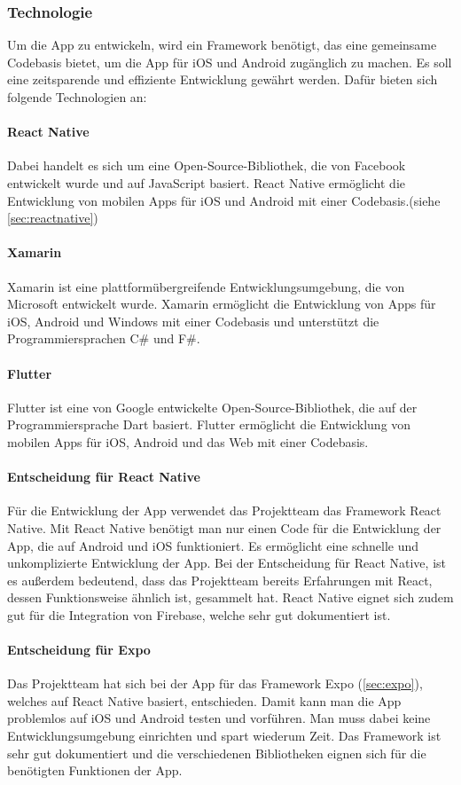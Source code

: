 \subsubsection{Technologie}
Um die App zu entwickeln, wird ein \Gls{Framework} benötigt, das eine gemeinsame Codebasis bietet, um die App für iOS und Android zugänglich zu machen. Es soll eine zeitsparende und effiziente Entwicklung gewährt werden. Dafür bieten sich folgende Technologien an:

\paragraph{React Native}
Dabei handelt es sich um eine \Gls{Open-Source}-Bibliothek, die von Facebook entwickelt wurde und auf JavaScript basiert. React Native ermöglicht die Entwicklung von mobilen Apps für iOS und Android mit einer Codebasis.(siehe \ref{sec:reactnative})

\paragraph{Xamarin}
Xamarin ist eine plattformübergreifende Entwicklungsumgebung, die von Microsoft entwickelt wurde. Xamarin ermöglicht die Entwicklung von Apps für iOS, Android und Windows mit einer Codebasis und unterstützt die Programmiersprachen C\# und F\#. 

\paragraph{Flutter}
Flutter ist eine von Google entwickelte \Gls{Open-Source}-Bibliothek, die auf der Programmiersprache Dart basiert. Flutter ermöglicht die Entwicklung von mobilen Apps für iOS, Android und das Web mit einer Codebasis. 

\paragraph{Entscheidung für React Native}
Für die Entwicklung der App verwendet das Projektteam das \Gls{Framework} React Native. Mit React Native benötigt man nur einen Code für die Entwicklung der App, die auf Android und iOS funktioniert. Es ermöglicht eine schnelle und unkomplizierte Entwicklung der App. Bei der Entscheidung für React Native, ist es außerdem bedeutend, dass das Projektteam bereits Erfahrungen mit React, dessen Funktionsweise ähnlich ist, gesammelt hat. React Native eignet sich zudem gut für die Integration von Firebase, welche sehr gut dokumentiert ist. 

\paragraph{Entscheidung für Expo}
\label{sec:entscheidungexpo}
Das Projektteam hat sich bei der App für das \Gls{Framework} Expo (\ref{sec:expo}), welches auf React Native basiert, entschieden. Damit kann man die App problemlos auf iOS und Android testen und vorführen. Man muss dabei keine Entwicklungsumgebung einrichten und spart wiederum Zeit. Das \Gls{Framework} ist sehr gut dokumentiert und die verschiedenen Bibliotheken eignen sich für die benötigten Funktionen der App.
